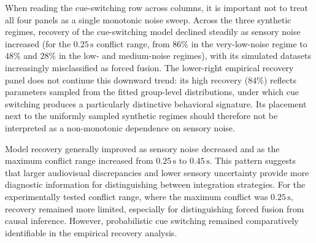 \documentclass{jov}
\begin{document}
When reading the cue-switching row across columns, it is important not to treat all four panels as a single monotonic noise sweep. Across the three synthetic regimes, recovery of the cue-switching model declined steadily as sensory noise increased (for the $0.25\,\mathrm{s}$ conflict range, from $86\%$ in the very-low-noise regime to $48\%$ and $28\%$ in the low- and medium-noise regimes), with its simulated datasets increasingly misclassified as forced fusion. The lower-right empirical recovery panel does not continue this downward trend: its high recovery ($84\%$) reflects parameters sampled from the fitted group-level distributions, under which cue switching produces a particularly distinctive behavioral signature. Its placement next to the uniformly sampled synthetic regimes should therefore not be interpreted as a non-monotonic dependence on sensory noise.


Model recovery generally improved as sensory noise decreased and as the maximum conflict range increased from $0.25\,\mathrm{s}$ to $0.45\,\mathrm{s}$. This pattern suggests that larger audiovisual discrepancies and lower sensory uncertainty provide more diagnostic information for distinguishing between integration strategies. For the experimentally tested conflict range, where the maximum conflict was $0.25\,\mathrm{s}$, recovery remained more limited, especially for distinguishing forced fusion from causal inference. However, probabilistic cue switching remained comparatively identifiable in the empirical recovery analysis.
\end{document}
